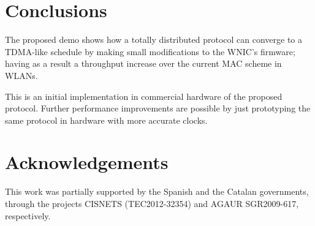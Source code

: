 \documentclass[a4paper,journal]{IEEEtran}
\begin{document}
\section{Conclusions}
The proposed demo shows how a totally distributed protocol can converge to a TDMA-like schedule by making small modifications to the WNIC's firmware; having as a result a throughput increase over the current MAC scheme in WLANs.

This is an initial implementation in commercial hardware of the proposed protocol. Further performance improvements are possible by just prototyping the same protocol in hardware with more accurate clocks.

\section{Acknowledgements}
This work was partially supported by the Spanish and the Catalan governments, through the projects CISNETS (TEC2012-32354) and AGAUR SGR2009-617, respectively.



\end{document}
